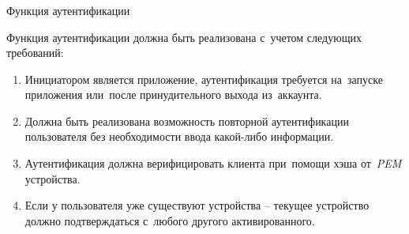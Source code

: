 \subsubsection{} Функция аутентификации
\label{sec:analysis:research:funcreq:auth}

Функция аутентификации должна быть реализована с~учетом следующих требований:

\begin{enumerate}
	\item Инициатором является приложение, аутентификация требуется на~запуске приложения или~после принудительного выхода из~аккаунта.
	\item Должна быть реализована возможность повторной аутентификации пользователя без необходимости ввода какой-либо информации.
	\item Аутентификация должна верифицировать клиента при~помощи хэша от~\textit{PEM} устройства.
	\item Если у пользователя уже существуют устройства -- текущее устройство должно подтверждаться с~любого другого активированного.
\end{enumerate}